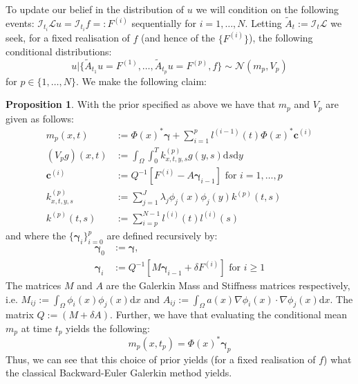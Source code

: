 \documentclass{article}
\theoremstyle{definition}
\newtheorem{proposition}{Proposition}[section]
\theoremstyle{remark}
\theoremstyle{remark}
\begin{document}
\noindent To update our belief in the distribution of $u$ we will condition on the following events: $\mathcal{I}_{t_{i}}\mathcal{L}u=\mathcal{I}_{t_{i}}f=:F^{(i)}$ sequentially for $i=1,\dots,N$. Letting $\tilde{A}_{t}:=\mathcal{I}_{t}\mathcal{L}$ we seek, for a fixed realisation of $f$ (and hence of the $\{F^{(i)}\}$), the following conditional distributions:
\begin{equation}
    u|\{\tilde{A}_{t_{1}}u=F^{(1)},\dots,\tilde{A}_{t_{p}}u=F^{(p)},f\}\sim\mathcal{N}(m_{p},V_{p})
\end{equation}
for $p\in\{1,\dots,N\}$. We make the following claim:
\begin{proposition}
    \label{proposition_1}
    With the prior specified as above we have that $m_{p}$ and $V_{p}$ are given as follows:
    \begin{align}
        m_{p}(x,t) &:= \Phi(x)^{*}\boldsymbol{\gamma} + \sum_{i=1}^{p}l^{(i-1)}(t)\Phi(x)^{*}\boldsymbol{c}^{(i)} \\
        (V_{p}g)(x,t) &:= \int_{\Omega}\int_{0}^{T}k^{(p)}_{x,t,y,s}g(y,s)\mathrm{d}s\mathrm{d}y \\
        \boldsymbol{c}^{(i)} &:= Q^{-1}\left[F^{(i)}-A\boldsymbol{\gamma}_{i-1}\right] \text{ for } i=1,\dots,p \\
        k^{(p)}_{x,t,y,s} &:= \sum_{j=1}^{J}\lambda_{j}\phi_{j}(x)\phi_{j}(y)k^{(p)}(t,s) \\
        k^{(p)}(t,s) &:= \sum_{i=p}^{N-1}l^{(i)}(t)l^{(i)}(s)
    \end{align}
    and where the $\{\boldsymbol{\gamma}_{i}\}_{i=0}^{p}$ are defined recursively by:
    \begin{align}
        \boldsymbol{\gamma}_{0} &:= \boldsymbol{\gamma}, \\
        \boldsymbol{\gamma}_{i} &:= Q^{-1}\left[M\boldsymbol{\gamma}_{i-1}+\delta F^{(i)}\right] \text{ for } i\geq 1
    \end{align}
    The matrices $M$ and $A$ are the Galerkin Mass and Stiffness matrices respectively, i.e. $M_{ij}:=\int_{\Omega}\phi_{i}(x)\phi_{j}(x)\mathrm{d}x$ and $A_{ij}:=\int_{\Omega}a(x)\nabla\phi_{i}(x)\cdot\nabla\phi_{j}(x)\mathrm{d}x$. The matrix $Q:=(M+\delta A)$. Further, we have that evaluating the conditional mean $m_{p}$ at time $t_p$ yields the following:
    \begin{equation}
        m_{p}(x,t_p) = \Phi(x)^{*}\boldsymbol{\gamma}_{p}
    \end{equation}
    Thus, we can see that this choice of prior yields (for a fixed realisation of $f$) what the classical Backward-Euler Galerkin method yields.
\end{proposition}
\end{document}
